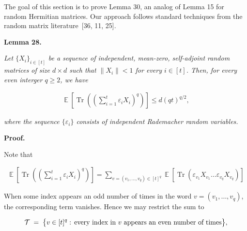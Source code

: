 \documentclass[10pt,a4paper]{article}
\begin{document}
The goal of this section is to prove Lemma 30, an analog of Lemma 15 for random Hermitian matrices. Our approach follows standard techniques from the random matrix literature [36, 11, 25].\par





\par\medskip\noindent\textbf{
\textbf{Lemma 28}\textbf{.}
}\par



\emph{Let $\{X_{i}\}_{i\in[t]}$ be a sequence of independent, mean-zero, self-adjoint random matrices of size $d\times d$ such that $\|X_{i}\|<1$ for every $i\in[t]$. Then, for every even interger $q\geq 2$, we have}\par


\[\begin{gathered}
\operatorname*{\mathbb{E}}\left[\operatorname*{Tr}\left(\left(\sum_{i=1}^{t}\varepsilon_{i}X_{i}\right)^{q}\right)\right]\leq d(qt)^{q/2},
\end{gathered}\]


\emph{where the sequence $\{\varepsilon_{i}\}$ consists of independent Rademacher random variables.}\par






\par\medskip\noindent\textbf{Proof.}\par




Note that\par


\[\begin{gathered}
\operatorname*{\mathbb{E}}\left[\operatorname*{Tr}\left(\left(\sum_{i=1}^{t}\varepsilon_{i}X_{i}\right)^{q}\right)\right]=\sum_{v=(v_{1},\dots,v_{q})\in[t]^{q}}\operatorname*{\mathbb{E}}\left[\operatorname*{Tr}(\varepsilon_{v_{1}}X_{v_{1}}\dots\varepsilon_{v_{q}}X_{v_{q}})\right]
\end{gathered}\]


When some index appears an odd number of times in the word
$v=(v_{1},\dots,v_{q})$, the corresponding term vanishes.
Hence we may restrict the sum to\par


\[\begin{gathered}
\mathcal{T}\;=\;\bigl{\{}v\in[t]^{q}:\,\text{every index in $v$ appears an even number of times}\bigr{\}},
\end{gathered}\]
\end{document}
